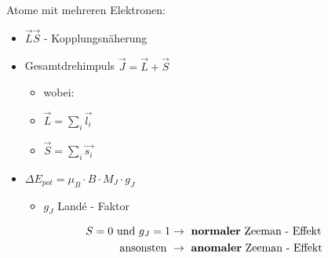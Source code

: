        \begin{myframe}{\subsecname}
            Atome mit mehreren Elektronen:
            \begin{itemize}
                \item $\vec{L} \vec{S}$ - Kopplungsnäherung
                \item Gesamtdrehimpuls $\vec{J} = \vec{L} + \vec{S}$
                \begin{itemize}
                    \item[] wobei:
                    \item $\vec{L} = \sum_i \vec{l_i}$
                    \item $\vec{S} = \sum_i \vec{s_i}$
                \end{itemize}
                \item $\Delta E_{pot} = \mu_B \cdot B \cdot M_J \cdot g_J $
                \begin{itemize}
                    \item $ g_{J}$ Landé - Faktor
                \end{itemize}
            \end{itemize}
            \begin{align*}
              S = 0 \text{ und } g_{J} = 1 &\rightarrow \text{ \textbf{normaler} Zeeman - Effekt} \\
              \text{ ansonsten } &\rightarrow \text{ \textbf{anomaler} Zeeman - Effekt}
            \end{align*}
        \end{myframe}



